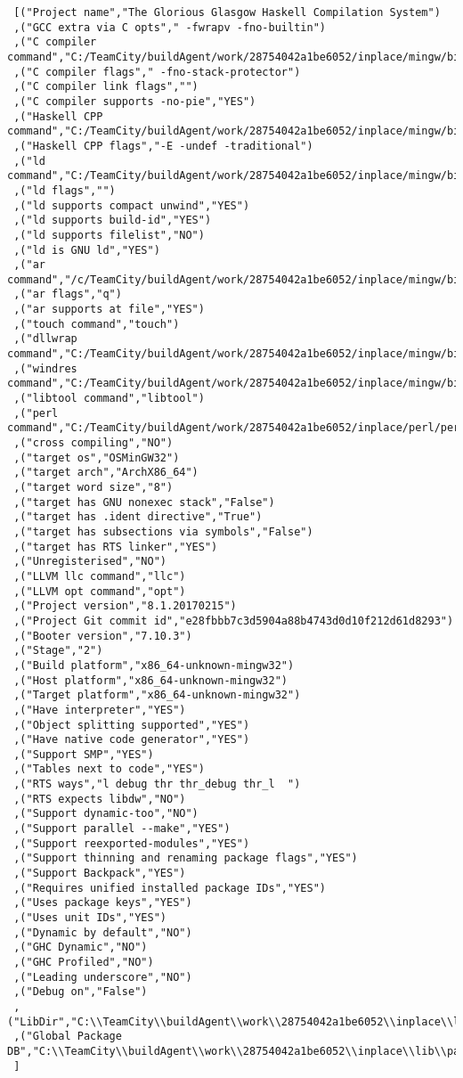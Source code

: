 \begin{verbatim}
 [("Project name","The Glorious Glasgow Haskell Compilation System")
 ,("GCC extra via C opts"," -fwrapv -fno-builtin")
 ,("C compiler command","C:/TeamCity/buildAgent/work/28754042a1be6052/inplace/mingw/bin/gcc.exe")
 ,("C compiler flags"," -fno-stack-protector")
 ,("C compiler link flags","")
 ,("C compiler supports -no-pie","YES")
 ,("Haskell CPP command","C:/TeamCity/buildAgent/work/28754042a1be6052/inplace/mingw/bin/gcc.exe")
 ,("Haskell CPP flags","-E -undef -traditional")
 ,("ld command","C:/TeamCity/buildAgent/work/28754042a1be6052/inplace/mingw/bin/ld.exe")
 ,("ld flags","")
 ,("ld supports compact unwind","YES")
 ,("ld supports build-id","YES")
 ,("ld supports filelist","NO")
 ,("ld is GNU ld","YES")
 ,("ar command","/c/TeamCity/buildAgent/work/28754042a1be6052/inplace/mingw/bin/ar")
 ,("ar flags","q")
 ,("ar supports at file","YES")
 ,("touch command","touch")
 ,("dllwrap command","C:/TeamCity/buildAgent/work/28754042a1be6052/inplace/mingw/bin/dllwrap.exe")
 ,("windres command","C:/TeamCity/buildAgent/work/28754042a1be6052/inplace/mingw/bin/windres.exe")
 ,("libtool command","libtool")
 ,("perl command","C:/TeamCity/buildAgent/work/28754042a1be6052/inplace/perl/perl")
 ,("cross compiling","NO")
 ,("target os","OSMinGW32")
 ,("target arch","ArchX86_64")
 ,("target word size","8")
 ,("target has GNU nonexec stack","False")
 ,("target has .ident directive","True")
 ,("target has subsections via symbols","False")
 ,("target has RTS linker","YES")
 ,("Unregisterised","NO")
 ,("LLVM llc command","llc")
 ,("LLVM opt command","opt")
 ,("Project version","8.1.20170215")
 ,("Project Git commit id","e28fbbb7c3d5904a88b4743d0d10f212d61d8293")
 ,("Booter version","7.10.3")
 ,("Stage","2")
 ,("Build platform","x86_64-unknown-mingw32")
 ,("Host platform","x86_64-unknown-mingw32")
 ,("Target platform","x86_64-unknown-mingw32")
 ,("Have interpreter","YES")
 ,("Object splitting supported","YES")
 ,("Have native code generator","YES")
 ,("Support SMP","YES")
 ,("Tables next to code","YES")
 ,("RTS ways","l debug thr thr_debug thr_l  ")
 ,("RTS expects libdw","NO")
 ,("Support dynamic-too","NO")
 ,("Support parallel --make","YES")
 ,("Support reexported-modules","YES")
 ,("Support thinning and renaming package flags","YES")
 ,("Support Backpack","YES")
 ,("Requires unified installed package IDs","YES")
 ,("Uses package keys","YES")
 ,("Uses unit IDs","YES")
 ,("Dynamic by default","NO")
 ,("GHC Dynamic","NO")
 ,("GHC Profiled","NO")
 ,("Leading underscore","NO")
 ,("Debug on","False")
 ,("LibDir","C:\\TeamCity\\buildAgent\\work\\28754042a1be6052\\inplace\\lib")
 ,("Global Package DB","C:\\TeamCity\\buildAgent\\work\\28754042a1be6052\\inplace\\lib\\package.conf.d")
 ]
\end{verbatim}
